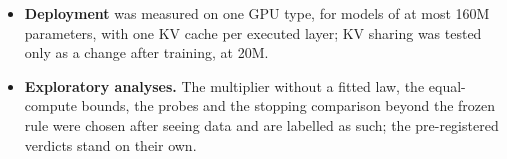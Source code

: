 \begin{itemize}
  extends on a task whose input length does not grow was not tested. The chain-of-thought models got no help with length
  generalisation, and continuous thoughts \citep{hao2025training} were not tried.
  \item \textbf{Deployment} was measured on one GPU type, for models of at most 160M parameters, with one KV cache per
  executed layer; KV sharing was tested only as a change after training, at 20M.
  \item \textbf{Exploratory analyses.} The multiplier without a fitted law, the equal-compute bounds, the probes and the
  stopping comparison beyond the frozen rule were chosen after seeing data and are labelled as such; the pre-registered
  verdicts stand on their own.
\end{itemize}

